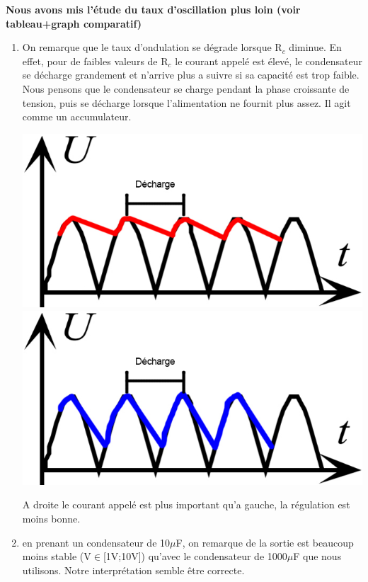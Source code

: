 \documentclass[12pt,a4paper]{article}
\begin{document}
\textbf{Nous avons mis l'étude du taux d'oscillation plus loin (voir tableau+graph comparatif)}
\begin{enumerate}
\item On remarque que le taux d'ondulation se dégrade lorsque R$_{c}$ diminue. En effet, pour de faibles valeurs de R$_{c}$ le courant appelé est élevé, le condensateur se décharge grandement et n'arrive plus a suivre si sa capacité est trop faible. Nous pensons que le condensateur se charge pendant la phase croissante de tension, puis se décharge lorsque l'alimentation ne fournit plus assez. Il agit comme un accumulateur.
\begin{multicols}{2}
\includegraphics[scale=0.25]{Condensateur}
\columnbreak
\includegraphics[scale=0.25]{Condensateur2}
\end{multicols}
A droite le courant appelé est plus important qu'a gauche, la régulation est moins bonne.
\item en prenant un condensateur de 10$\mu$F, on remarque de la sortie est beaucoup moins stable (V$\in$[1V;10V]) qu'avec le condensateur de 1000$\mu$F que nous utilisons. Notre interprétation semble être correcte.
\end{enumerate}
\end{document}
